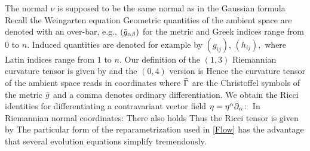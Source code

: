 The normal $\nu$ is supposed to be the same normal as in the Gaussian formula
Recall the Weingarten equation
Geometric quantities of the ambient space are denoted with an over-bar, e.g., $(\-g_{\a\b})$ for the metric and Greek indices range from $0$ to $n.$ Induced quantities are denoted for example by $(g_{ij})$, $(h_{ij}),$ where Latin indices range from $1$ to $n.$
Our definition of the $(1,3)$ Riemannian curvature tensor is given by
and the $(0,4)$ version is
Hence the curvature tensor of the ambient space reads in coordinates
where $\-\G$ are the Christoffel symbols of the metric $\-g$ and a comma denotes ordinary differentiation.
We obtain the Ricci identities for differentiating a contravariant vector field $\eta=\eta^{\a}\del_{\a}\cn$
In Riemannian normal coordinates:
There also holds
Thus the Ricci tensor is given by
The particular form of the reparametrization used in \eqref{Flow} has the advantage that several evolution equations simplify tremendously.
